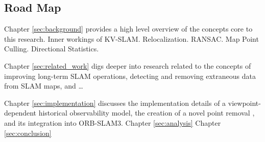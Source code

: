 \subsection{Road Map}

Chapter \ref{sec:background} provides a high level overview of the concepts core to this research. Inner workings of KV-SLAM. Relocalization. RANSAC. Map Point Culling. Directional Statistics.

Chapter \ref{sec:related_work} digs deeper into research related to the concepts of improving long-term SLAM operations, detecting and removing extraneous data from SLAM maps, and \dots

Chapter \ref{sec:implementation} discusses the implementation details of a viewpoint-dependent historical observability model, the creation of a novel point removal , and its integration into ORB-SLAM3. 
Chapter \ref{sec:analysis}
Chapter \ref{sec:conclusion}